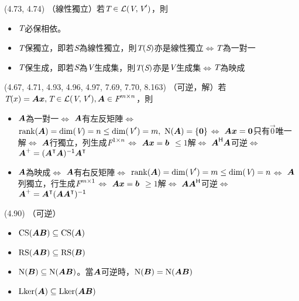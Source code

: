 \item \begin{theorem}{(4.73, 4.74)} （線性獨立）若$\T \in \L(\V, \V')$，則
	\begin{itemize}
		\item $\T$必保相依。
		\item $\T$保獨立，即若$\spc{S}$為線性獨立，則$\T(\spc{S})$亦是線性獨立$\iff$$\T$為一對一
		\item $\T$保生成，即若$\spc{S}$為$\V$生成集，則$\T(\spc{S})$亦是$\V$生成集$\iff$$\T$為映成
	\end{itemize}
\end{theorem}

\item \begin{theorem}{(4.67, 4.71, 4.93, 4.96, 4.97, 7.69, 7.70, 8.163)} （可逆，解）若$\T(x) = \mat{A}\vec{x}, \T \in \L(\V, \V'), \mat{A} \in \F^{m \times n}$，則
	\begin{itemize}
		\item $\mat{A}$為一對一$\iff$
		$\mat{A}$有左反矩陣$\iff$
		$\rnk(\mat{A}) = \dim(\V) = n \le \dim(\V') = m, \ \Ker(\mat{A}) = \{\vec{0}\}$$\iff$
		$\mat{A}\vec{x} = \vec{0}$只有$\vec{0}$唯一解$\iff$
		$\mat{A}$行獨立，列生成$\F^{1 \times n}$$\iff$
		$\mat{A}\vec{x} = \vec{b}$ $\le 1$解$\iff$
		$\mat{A}\herm \mat{A}$可逆$\iff$
		$\mat{A}^+ = (\mat{A}^\intercal\mat{A})\inv\mat{A}^\intercal$
		\item $\mat{A}$為映成$\iff$
		$\mat{A}$有右反矩陣$\iff$
		$\rnk(\mat{A}) = \dim(\V') = m \le \dim(\V) = n$$\iff$
		$\mat{A}$列獨立，行生成$\F^{m \times 1}$$\iff$
		$\mat{A}\vec{x} = \vec{b}$ $\ge 1$解$\iff$
		$\mat{A}\mat{A}\herm$可逆$\iff$
		$\mat{A}^+ = \mat{A}^\intercal(\mat{A}\mat{A}^\intercal)\inv$
	\end{itemize}
\end{theorem}

\item \begin{theorem}{(4.90)} （可逆）
	\begin{itemize}
		\item $\cs(\mat{AB}) \subseteq \cs(\mat{A})$
		\item $\rs(\mat{AB}) \subseteq \rs(\mat{B})$
		\item $\Ker(\mat{B}) \subseteq \Ker(\mat{AB})$。當$\mat{A}$可逆時，$\Ker(\mat{B}) = \Ker(\mat{AB})$
		\item $\lker(\mat{A}) \subseteq \lker(\mat{AB})$
	\end{itemize}
\end{theorem}
